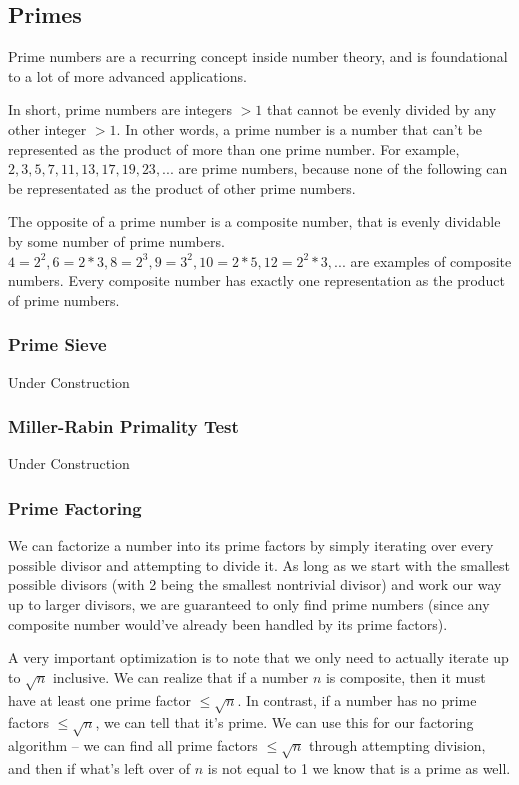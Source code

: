 \subsection{Primes}

Prime numbers are a recurring concept inside number theory, and is foundational to a lot of more advanced applications.

In short, prime numbers are integers $> 1$ that cannot be evenly divided by any other integer $> 1$. In other words, a prime number is a number that can't be represented as the product of more than one prime number. For example, $2, 3, 5, 7, 11, 13, 17, 19, 23, ...$ are prime numbers, because none of the following can be representated as the product of other prime numbers.

The opposite of a prime number is a composite number, that is evenly dividable by some number of prime numbers. $4 = 2^2, 6 = 2*3, 8 = 2^3, 9 = 3^2, 10 = 2*5, 12 = 2^2*3, ...$ are examples of composite numbers. Every composite number has exactly one representation as the product of prime numbers.

\subsubsection{Prime Sieve}
 

Under Construction

\subsubsection{Miller-Rabin Primality Test}
 

Under Construction

\subsubsection{Prime Factoring}

We can factorize a number into its prime factors by simply iterating over every possible divisor and attempting to divide it. As long as we start with the smallest possible divisors (with 2 being the smallest nontrivial divisor) and work our way up to larger divisors, we are guaranteed to only find prime numbers (since any composite number would've already been handled by its prime factors).

A very important optimization is to note that we only need to actually iterate up to $\sqrt{n}$ inclusive. We can realize that if a number $n$ is composite, then it must have at least one prime factor $\le \sqrt{n}$. In contrast, if a number has no prime factors $\le \sqrt{n}$, we can tell that it's prime. We can use this for our factoring algorithm -- we can find all prime factors $\le \sqrt{n}$ through attempting division, and then if what's left over of $n$ is not equal to 1 we know that is a prime as well.

